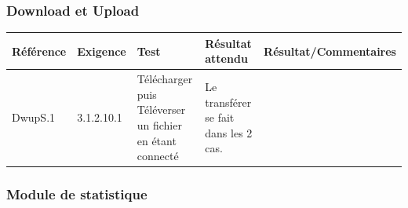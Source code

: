 \documentclass[10pt,a4paper,landscape]{report}
\begin{document}
\subsubsection{Download et Upload}
\begin{center}
	\bgroup
	\def\arraystretch{1.5}
	\begin{tabular}{|p{2.5cm}|p{2cm}|p{8cm}|p{8cm}|p{5cm}|}
		\hline
		\rowcolor{gris}Référence & Exigence & Test & Résultat attendu & Résultat/Commentaires\\
		\hline
		DwupS.1 & 3.1.2.10.1 & Télécharger puis Téléverser un fichier en étant connecté & Le transférer se fait dans les 2 cas. & \\
		\hline
	\end{tabular}
	\egroup
\end{center}

\subsubsection{Module de statistique}
\end{document}
